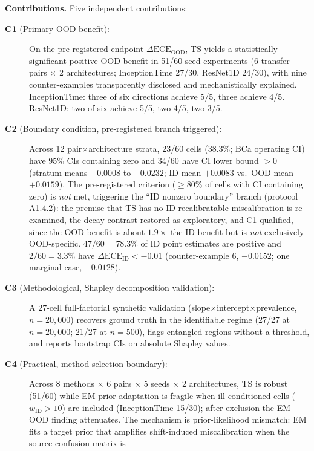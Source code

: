 \documentclass[review,12pt,nonatbib]{elsarticle}
\begin{document}
\textbf{Contributions.} Five independent contributions:
\begin{description}
    \item[\textbf{C1} (Primary OOD benefit):] On the pre-registered
    endpoint $\Delta\text{ECE}_{\text{OOD}}$, TS yields a statistically
    significant positive OOD benefit in 51/60 seed experiments (6 transfer
    pairs $\times$ 2 architectures; InceptionTime 27/30, ResNet1D 24/30),
    with nine counter-examples transparently disclosed and mechanistically
    explained.
    InceptionTime: three of six directions achieve 5/5, three achieve 4/5.
    ResNet1D: two of six achieve 5/5, two 4/5, two 3/5.
    \item[\textbf{C2} (Boundary condition, pre-registered branch triggered):]
    Across 12 pair$\times$architecture strata, 23/60 cells (38.3\%;
    BCa operating CI) have 95\% CIs containing zero and 34/60 have CI
    lower bound $>0$ (stratum means $-0.0008$ to $+0.0232$; ID mean
    $+0.0083$ vs.\ OOD mean $+0.0159$). The pre-registered criterion
    ($\geq$80\% of cells with CI containing zero) is \emph{not} met,
    triggering the ``ID nonzero boundary'' branch (protocol A1.4.2):
    the premise that TS has no ID recalibratable miscalibration is
    re-examined, the decay contrast restored as exploratory, and C1
    qualified, since the OOD benefit is about $1.9\times$ the ID benefit
    but is \emph{not} exclusively OOD-specific. $47/60 = 78.3\%$ of ID
    point estimates are positive and $2/60 = 3.3\%$ have
    $\Delta\text{ECE}_{\text{ID}} < -0.01$ (counter-example 6, $-0.0152$;
    one marginal case, $-0.0128$).
    \item[\textbf{C3} (Methodological, Shapley decomposition validation):]
    A 27-cell full-factorial synthetic validation
    (slope$\times$intercept$\times$prevalence, $n=20{,}000$) recovers
    ground truth in the identifiable regime (27/27 at $n=20{,}000$;
    21/27 at $n=500$), flags entangled regions without a threshold,
    and reports bootstrap CIs on absolute Shapley values.
    \item[\textbf{C4} (Practical, method-selection boundary):] Across
    8 methods $\times$ 6 pairs $\times$ 5 seeds $\times$ 2 architectures,
    TS is robust (51/60) while EM prior adaptation is fragile when
    ill-conditioned cells ($w_{\text{ID}}>10$) are included (InceptionTime
    15/30); after exclusion the EM OOD finding attenuates. The mechanism
    is prior-likelihood mismatch: EM fits a target prior that amplifies
    shift-induced miscalibration when the source confusion matrix is

\end{description}
\end{document}
